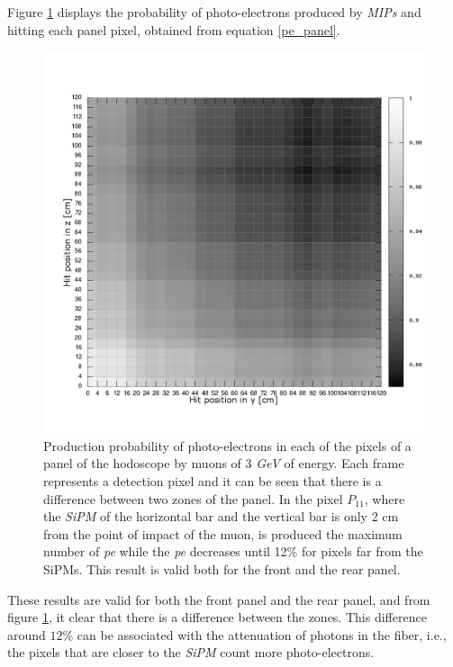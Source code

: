 \documentclass[submitting]{nst}
\begin{document}
Figure \ref{atenuacion_panel_bw} displays the probability of photo-electrons produced by \textsl{MIPs} and hitting each panel pixel, obtained from equation \ref{pe_panel}.
\begin{figure}[h!]
    \centering
        \includegraphics[scale=0.3]{Figures/atenuacion_panel_bw.png}
   \caption[Response of the hodoscope panels]{Production probability of photo-electrons in each of the pixels of a panel of the hodoscope by muons of 3   \textsl{GeV}  of energy. Each frame represents a detection pixel and it can be seen that there is a difference between two zones of the panel. In the pixel $P_{11}$, where the \textsl{SiPM} of the horizontal bar and the vertical bar is only 2 cm from the point of impact of the muon, is produced the maximum number of \textsl{pe} while the \textsl{pe} decreases until 12\% for pixels far from the SiPMs. This result is valid both for the front and the rear panel.}\label{atenuacion_panel_bw}
\end{figure}

These results are valid for both the front panel and the rear panel, and from figure \ref{atenuacion_panel_bw}, it clear that there is a difference between the zones. This difference around $12$\% can be associated with the attenuation of photons in the fiber, i.e., the pixels that are closer to the \textsl{SiPM} count more photo-electrons.  
\end{document}
